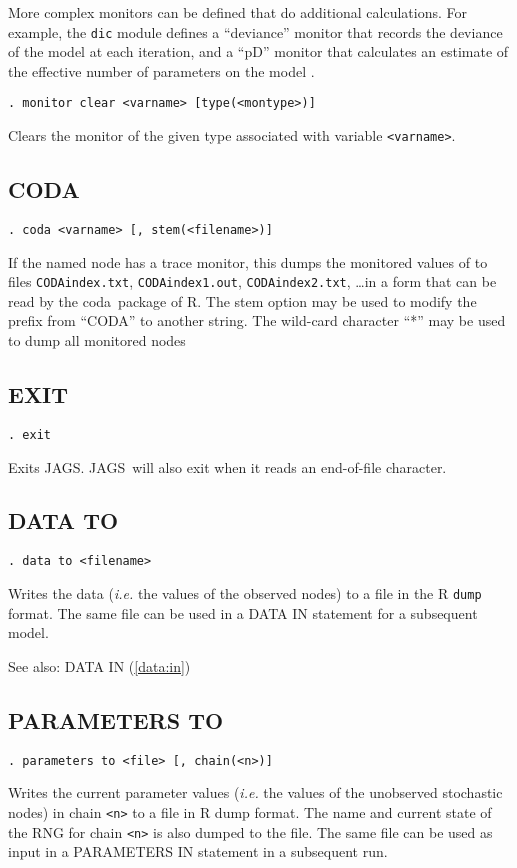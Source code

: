 \documentclass[11pt, a4paper, titlepage]{report}
\newcommand{\JAGS}{\textsf{JAGS}}
\newcommand{\R}{\textsf{R}}
\newcommand{\CODA}{\textsf{coda}}
\begin{document}
More complex monitors can be defined that do additional calculations.
For example, the \verb+dic+ module defines a ``deviance'' monitor that
records the deviance of the model at each iteration, and a ``pD''
monitor that calculates an estimate of the effective number of
parameters on the model \cite{spiegelhalter:etal:2002}.  

\begin{verbatim}
. monitor clear <varname> [type(<montype>)]
\end{verbatim}
Clears the monitor of the given type associated with variable
\texttt{<varname>}. 

\subsection{CODA}
\label{coda}

\begin{verbatim}
. coda <varname> [, stem(<filename>)]
\end{verbatim}
If the named node has a trace monitor, this dumps the monitored values
of to files \texttt{CODAindex.txt}, \texttt{CODAindex1.out},
\texttt{CODAindex2.txt}, \ldots in a form that can be read by the
\CODA\ package of \R.  The stem option may be used to modify the
prefix from ``CODA'' to another string.  The wild-card character ``*''
may be used to dump all monitored nodes

\subsection{EXIT}

\begin{verbatim}
. exit
\end{verbatim}
Exits \JAGS. \JAGS\ will also exit when it reads an end-of-file character.

\subsection{DATA TO}
\label{data:to}
\begin{verbatim}
. data to <filename>
\end{verbatim}
Writes the data ({\em i.e.} the values of the observed nodes) to a
file in the R \texttt{dump} format. The same file can be used in a
DATA IN statement for a subsequent model.

See also: DATA IN (\ref{data:in})

\subsection{PARAMETERS TO}
\label{parameters:to}
\begin{verbatim}
. parameters to <file> [, chain(<n>)]
\end{verbatim}
Writes the current parameter values ({\em i.e.} the values of the
unobserved stochastic nodes) in chain \texttt{<n>} to a file in R dump
format. The name and current state of the RNG for chain \texttt{<n>}
is also dumped to the file.  The same file can be used as input in a
PARAMETERS IN statement in a subsequent run.
\end{document}
